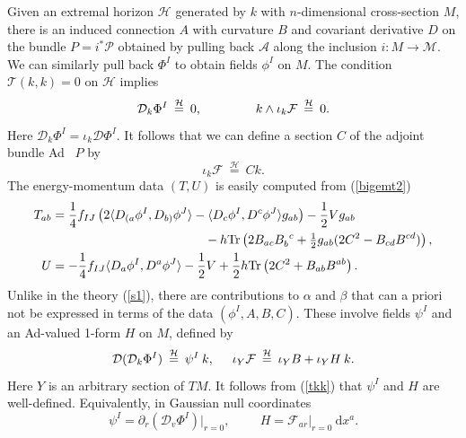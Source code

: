 \documentclass[11pt, reqno]{amsart}
\theoremstyle{plain}
\theoremstyle{definition}
\numberwithin{equation}{section}
\begin{document}
Given an extremal horizon $\mathcal{H}$ generated by $k$ with $n$-dimensional cross-section $M$, there is an induced connection $A$ with curvature $B$ and covariant derivative $D$ on the bundle $P = i^*\mathcal{P}$ obtained by pulling back $\mathcal{A}$ along the inclusion $i: M \to \mathcal{M}$. We can similarly pull back $\Phi^I$ to obtain fields $\phi^I$ on $M$. The condition $\mathcal{T}(k,k) = 0$ on $\mathcal{H}$ implies 
\begin{equation} \label{tkk}
    \mathcal{D}_k\Phi^I \:\overset{\mathcal{H}}{=}\:0, \hspace{1.5cm} k \wedge \iota_k\mathcal{F} \:\overset{\mathcal{H}}{=}\:0.
\end{equation} Here $\mathcal{D}_k \Phi^I = \iota_k \mathcal{D}\Phi^I$. It follows that we can define a section $C$ of the adjoint bundle Ad ~$P$ by 
\begin{equation*}
    \iota_k \mathcal{F} \:\overset{\mathcal{H}}{=}\: C k.
\end{equation*}
The energy-momentum data $(T,U)$ is easily computed from (\ref{bigemt2})
\begin{subequations}
\begin{align}
    T_{ab} &= \frac 14f_{IJ}\left(2\langle D_{(a}\phi^I, D_{b)}\phi^J\rangle - \langle D_c\phi^I, D^c\phi^J\rangle g_{ab}\right)
   - \frac 12 Vg_{ab} \nonumber \\&\hspace{4.3cm} - h\text{Tr}\left(2B_{ac}B_b^{\:\:c} + \tfrac 12g_{ab}(2C^2 - B_{cd}B^{cd})\right), \\
    U &= - \frac 14f_{IJ}\langle D_a\phi^I, D^a\phi^J\rangle - \frac 12 V +\frac 12 h\text{Tr}\left(2C^2 + B_{ab}B^{ab}\right).
\end{align}
\end{subequations}
Unlike in the theory (\ref{s1}), there are contributions to $\alpha$ and $\beta$ that can a priori not be expressed in terms of the data $(\phi^I,A,B,C)$. These involve fields $\psi^I$ and an Ad-valued 1-form $H$ on $M$, defined by
\begin{equation} \label{Hdef}
    \mathcal{D}(\mathcal{D}_k \Phi^I) \:\overset{\mathcal{H}}{=}\: \psi^I \:k, \hspace{.5cm} \iota_Y \mathcal{F} \:\overset{\mathcal{H}}{=}\: \iota_YB + \iota_Y H \:k. 
\end{equation}
Here $Y$ is an arbitrary section of $TM$. It follows from (\ref{tkk}) that $\psi^I$ and $H$ are well-defined. Equivalently, in Gaussian null coordinates
\begin{equation*}
    \psi^I = \partial_r(\mathcal{D}_v\Phi^I)\vert_{r = 0}, \hspace{1cm} H = \mathcal{F}_{ar}\vert_{r = 0}\:\text{d}x^a.
\end{equation*}
\end{document}
